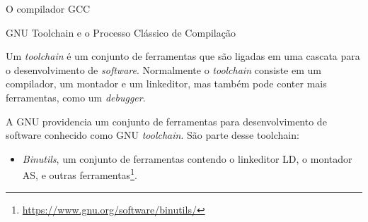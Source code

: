 \begin{section}{O compilador GCC}

%
%


\begin{subsection}{GNU Toolchain e o Processo Clássico de Compilação}

    Um \textit{toolchain} é um conjunto de ferramentas que são ligadas em
uma cascata para o desenvolvimento de \textit{software}. Normalmente o
\textit{toolchain} consiste em um compilador, um montador e um linkeditor,
mas também pode conter mais ferramentas, como um \textit{debugger}.

A GNU providencia um conjunto de ferramentas para desenvolvimento de software
conhecido como GNU \textit{toolchain}. São parte desse toolchain:
\begin{itemize}
    \item \textit{Binutils}, um conjunto de ferramentas contendo o linkeditor
LD, o montador AS, e outras ferramentas\footnote{\url{https://www.gnu.org/software/binutils/}}.


\end{itemize}
\end{subsection}
\end{section}
